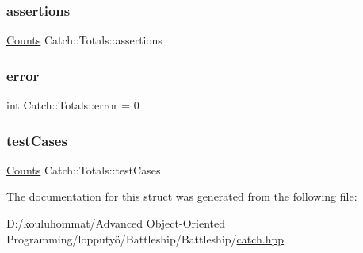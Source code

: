 \subsubsection{\texorpdfstring{assertions}{assertions}}
{\footnotesize\ttfamily \mbox{\hyperlink{struct_catch_1_1_counts}{Counts}} Catch\+::\+Totals\+::assertions}

\mbox{\label{struct_catch_1_1_totals_a6ea14c7de7ea735a14f172a26e08a239}} 
\subsubsection{\texorpdfstring{error}{error}}
{\footnotesize\ttfamily int Catch\+::\+Totals\+::error = 0}

\mbox{\label{struct_catch_1_1_totals_adb195fe477aedee2ecea88c888f16506}} 
\subsubsection{\texorpdfstring{test\+Cases}{testCases}}
{\footnotesize\ttfamily \mbox{\hyperlink{struct_catch_1_1_counts}{Counts}} Catch\+::\+Totals\+::test\+Cases}



The documentation for this struct was generated from the following file\+:\begin{DoxyCompactItemize}
\item 
D\+:/kouluhommat/\+Advanced Object-\/\+Oriented Programming/lopputyö/\+Battleship/\+Battleship/\mbox{\hyperlink{catch_8hpp}{catch.\+hpp}}\end{DoxyCompactItemize}
